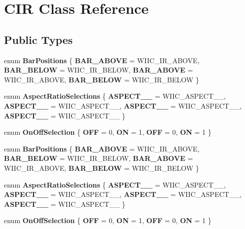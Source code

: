 \hypertarget{class_c_i_r}{\section{C\-I\-R Class Reference}
\label{class_c_i_r}
}
\subsection*{Public Types}
\begin{DoxyCompactItemize}
\item 
enum {\bfseries Bar\-Positions} \{ {\bfseries B\-A\-R\-\_\-\-A\-B\-O\-V\-E} =  W\-I\-I\-C\-\_\-\-I\-R\-\_\-\-A\-B\-O\-V\-E, 
{\bfseries B\-A\-R\-\_\-\-B\-E\-L\-O\-W} =  W\-I\-I\-C\-\_\-\-I\-R\-\_\-\-B\-E\-L\-O\-W, 
{\bfseries B\-A\-R\-\_\-\-A\-B\-O\-V\-E} =  W\-I\-I\-C\-\_\-\-I\-R\-\_\-\-A\-B\-O\-V\-E, 
{\bfseries B\-A\-R\-\_\-\-B\-E\-L\-O\-W} =  W\-I\-I\-C\-\_\-\-I\-R\-\_\-\-B\-E\-L\-O\-W
 \}
\item 
enum {\bfseries Aspect\-Ratio\-Selections} \{ {\bfseries A\-S\-P\-E\-C\-T\-\_\-\_} =  W\-I\-I\-C\-\_\-\-A\-S\-P\-E\-C\-T\-\_\-\_, 
{\bfseries A\-S\-P\-E\-C\-T\-\_\-\_} =  W\-I\-I\-C\-\_\-\-A\-S\-P\-E\-C\-T\-\_\-\_, 
{\bfseries A\-S\-P\-E\-C\-T\-\_\-\_} =  W\-I\-I\-C\-\_\-\-A\-S\-P\-E\-C\-T\-\_\-\_, 
{\bfseries A\-S\-P\-E\-C\-T\-\_\-\_} =  W\-I\-I\-C\-\_\-\-A\-S\-P\-E\-C\-T\-\_\-\_
 \}
\item 
enum {\bfseries On\-Off\-Selection} \{ {\bfseries O\-F\-F} =  0, 
{\bfseries O\-N} =  1, 
{\bfseries O\-F\-F} =  0, 
{\bfseries O\-N} =  1
 \}
\item 
enum {\bfseries Bar\-Positions} \{ {\bfseries B\-A\-R\-\_\-\-A\-B\-O\-V\-E} =  W\-I\-I\-C\-\_\-\-I\-R\-\_\-\-A\-B\-O\-V\-E, 
{\bfseries B\-A\-R\-\_\-\-B\-E\-L\-O\-W} =  W\-I\-I\-C\-\_\-\-I\-R\-\_\-\-B\-E\-L\-O\-W, 
{\bfseries B\-A\-R\-\_\-\-A\-B\-O\-V\-E} =  W\-I\-I\-C\-\_\-\-I\-R\-\_\-\-A\-B\-O\-V\-E, 
{\bfseries B\-A\-R\-\_\-\-B\-E\-L\-O\-W} =  W\-I\-I\-C\-\_\-\-I\-R\-\_\-\-B\-E\-L\-O\-W
 \}
\item 
enum {\bfseries Aspect\-Ratio\-Selections} \{ {\bfseries A\-S\-P\-E\-C\-T\-\_\-\_} =  W\-I\-I\-C\-\_\-\-A\-S\-P\-E\-C\-T\-\_\-\_, 
{\bfseries A\-S\-P\-E\-C\-T\-\_\-\_} =  W\-I\-I\-C\-\_\-\-A\-S\-P\-E\-C\-T\-\_\-\_, 
{\bfseries A\-S\-P\-E\-C\-T\-\_\-\_} =  W\-I\-I\-C\-\_\-\-A\-S\-P\-E\-C\-T\-\_\-\_, 
{\bfseries A\-S\-P\-E\-C\-T\-\_\-\_} =  W\-I\-I\-C\-\_\-\-A\-S\-P\-E\-C\-T\-\_\-\_
 \}
\item 
enum {\bfseries On\-Off\-Selection} \{ {\bfseries O\-F\-F} =  0, 
{\bfseries O\-N} =  1, 
{\bfseries O\-F\-F} =  0, 
{\bfseries O\-N} =  1
 \}
\end{DoxyCompactItemize}
